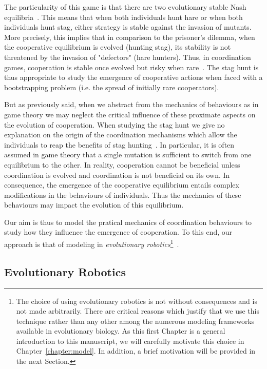     The particularity of this game is that there are two evolutionary stable Nash equilibria~\parencite{Nash1950, MaynardSmith1973}. This means that when both individuals hunt hare or when both individuals hunt stag, either strategy is stable against the invasion of mutants. More precisely, this implies that in comparison to the prisoner's dilemma, when the cooperative equilibrium is evolved (hunting stag), its stability is not threatened by the invasion of "defectors" (hare hunters). Thus, in coordination games, cooperation is stable once evolved but risky when rare~\parencite{Forber2015}. The stag hunt is thus appropriate to study the emergence of cooperative actions when faced with a bootstrapping problem (i.e. the spread of initially rare cooperators).

    But as previously said, when we abstract from the mechanics of behaviours as in game theory we may neglect the critical influence of these proximate aspects on the evolution of cooperation. When studying the stag hunt we give no explanation on the origin of the coordination mechanisms which allow the individuals to reap the benefits of stag hunting~\parencite{Calcott2007a}. In particular, it is often assumed in game theory that a single mutation is sufficient to switch from one equilibrium to the other. In reality, cooperation cannot be beneficial unless coordination is evolved and coordination is not beneficial on its own. In consequence, the emergence of the cooperative equilibrium entails complex modifications in the behaviours of individuals. Thus the mechanics of these behaviours may impact the evolution of this equilibrium.

    Our aim is thus to model the pratical mechanics of coordination behaviours to study how they influence the emergence of cooperation. To this end, our approach is that of modeling in \emph{evolutionary robotics}\footnote{The choice of using evolutionary robotics is not without consequences and is not made arbitrarily. There are critical reasons which justify that we use this technique rather than any other among the numerous modeling frameworks available in evolutionary biology. As this first Chapter is a general introduction to this manuscript, we will carefully motivate this choice in Chapter~\ref{chapter:model}. In addition, a brief motivation will be provided in the next Section.}~\parencite{Nolfi2000}.


  \subsection{Evolutionary Robotics}

